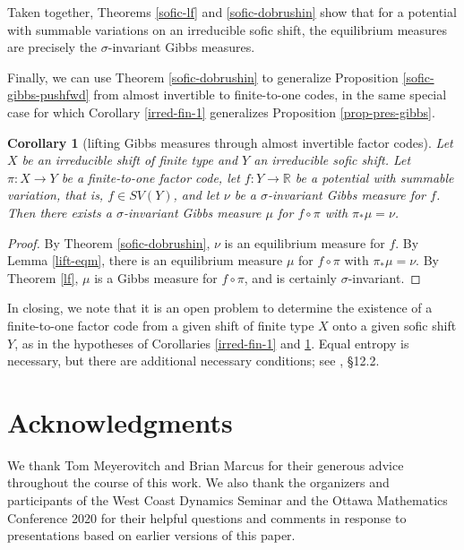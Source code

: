 \documentclass{amsproc}
\numberwithin{theorem}{section}
\newtheorem{corollary}[theorem]{Corollary}
\theoremstyle{remark}
\theoremstyle{definition}
\newcommand{\R}{\mathbb{R}}
\theoremstyle{plain}
\begin{document}
Taken together, Theorems \ref{sofic-lf} and \ref{sofic-dobrushin} show that for a potential with summable variations on an irreducible sofic shift, the equilibrium measures are precisely the $\sigma$-invariant Gibbs measures.

Finally, we can use Theorem \ref{sofic-dobrushin} to generalize Proposition \ref{sofic-gibbs-pushfwd} from almost invertible to finite-to-one codes, in the same special case for which Corollary \ref{irred-fin-1} generalizes Proposition \ref{prop-pres-gibbs}.

\begin{corollary}[lifting Gibbs measures through almost invertible factor codes]\label{lift-gibbs-fin-1}
Let $X$ be an irreducible shift of finite type and $Y$ an irreducible sofic shift. Let $\pi: X \to Y$ be a finite-to-one factor code, let $f\colon Y \to \R$  be a potential with summable variation, that is, $f \in SV(Y)$, and let $\nu$ be a $\sigma$-invariant Gibbs measure for $f$. Then there exists a $\sigma$-invariant Gibbs measure $\mu$ for $f \circ \pi$ with $\pi_* \mu = \nu$.
\end{corollary}

\begin{proof}
By Theorem \ref{sofic-dobrushin}, $\nu$ is an equilibrium measure for $f$. By Lemma \ref{lift-eqm}, there is an equilibrium measure $\mu$ for $f \circ \pi$ with $\pi_* \mu = \nu$. By Theorem \ref{lf}, $\mu$ is a Gibbs measure for $f \circ \pi$, and is certainly $\sigma$-invariant.
\end{proof}

In closing, we note that it is an open problem to determine the existence of a finite-to-one factor code from a given shift of finite type $X$ onto a given sofic shift $Y$, as in the hypotheses of Corollaries \ref{irred-fin-1} and \ref{lift-gibbs-fin-1}. Equal entropy is necessary, but there are additional necessary conditions; see \cite{lind1995introduction}, \S 12.2. 


\section*{Acknowledgments}

We thank Tom Meyerovitch and Brian Marcus for their generous advice throughout the course of this work. We also thank the organizers and participants of the West Coast Dynamics Seminar and the Ottawa Mathematics Conference 2020 for their helpful questions and comments in response to presentations based on earlier versions of this paper.
\end{document}
